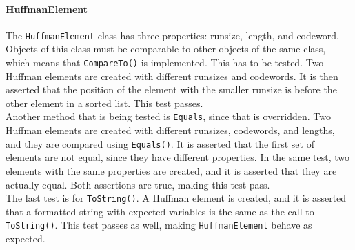 \paragraph*{HuffmanElement}
The \lstinline|HuffmanElement| class has three properties: runsize, length, and codeword.
Objects of this class must be comparable to other objects of the same class, which means that \lstinline|CompareTo()| is implemented.
This has to be tested.
Two Huffman elements are created with different runsizes and codewords.
It is then asserted that the position of the element with the smaller runsize is before the other element in a sorted list.
This test passes.\\
Another method that is being tested is \lstinline|Equals|, since that is overridden.
Two Huffman elements are created with different runsizes, codewords, and lengths, and they are compared using \lstinline|Equals()|.
It is asserted that the first set of elements are not equal, since they have different properties.
In the same test, two elements with the same properties are created, and it is asserted that they are actually equal.
Both assertions are true, making this test pass.\\
The last test is for \lstinline|ToString()|.
A Huffman element is created, and it is asserted that a formatted string with expected variables is the same as the call to \lstinline|ToString()|.
This test passes as well, making \lstinline|HuffmanElement| behave as expected.

